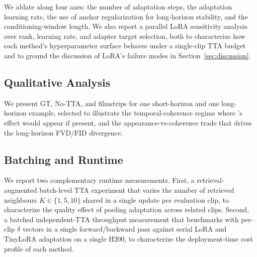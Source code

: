 We ablate \method along four axes: the number of adaptation steps, the
adaptation learning rate, the use of anchor regularization for long-horizon
stability, and the conditioning-window length. We also report a parallel
LoRA sensitivity analysis over rank, learning rate, and adapter target
selection, both to characterize how each method's hyperparameter surface
behaves under a single-clip TTA budget and to ground the discussion of
LoRA's failure modes in Section~\ref{sec:discussion}.

\subsection{Qualitative Analysis}
\label{sec:exp_qualitative}

We present GT, No-TTA, and \method filmstrips for one short-horizon and one
long-horizon example, selected to illustrate the temporal-coherence regime
where \method's effect would appear if present, and the
appearance-vs-coherence trade that drives the long-horizon FVD/FID
divergence.

\subsection{Batching and Runtime}
\label{sec:exp_batching}

We report two complementary runtime measurements. First, a
retrieval-augmented batch-level TTA experiment that varies the number of
retrieved neighbours $K \in \{1,5,10\}$ shared in a single \method update
per evaluation clip, to characterize the quality effect of pooling
adaptation across related clips. Second, a batched independent-TTA
throughput measurement that benchmarks \method with per-clip $\delta$
vectors in a single forward/backward pass against serial LoRA and TinyLoRA
adaptation on a single H200, to characterize the deployment-time cost
profile of each method.
